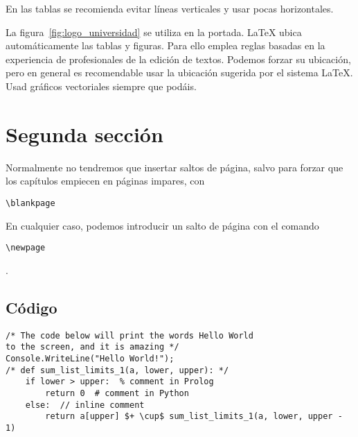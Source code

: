 \documentclass[twoside]{tfg-urjc}
\begin{document}
En las tablas se recomienda evitar líneas verticales y usar pocas horizontales. 

La figura~\ref{fig:logo_universidad} se utiliza en la portada. \LaTeX
ubica automáticamente las tablas y figuras. Para ello emplea reglas
basadas en la experiencia de profesionales de la edición de
textos. Podemos forzar su ubicación, pero en general es recomendable
usar la ubicación sugerida por el sistema \LaTeX. Usad gráficos
vectoriales siempre que podáis.




\section{Segunda sección}

Normalmente no tendremos que insertar saltos de página, salvo para forzar que los capítulos empiecen en páginas impares, con \begin{verbatim}\blankpage\end{verbatim} En cualquier caso, podemos introducir un salto de página con el comando \begin{verbatim}\newpage\end{verbatim}.

\newpage



\subsection{Código}

\begin{lstlisting}
/* The code below will print the words Hello World
to the screen, and it is amazing */
Console.WriteLine("Hello World!"); 
/* def sum_list_limits_1(a, lower, upper): */
    if lower > upper:  % comment in Prolog
        return 0  # comment in Python 
    else:  // inline comment
        return a[upper] $+ \cup$ sum_list_limits_1(a, lower, upper - 1)
\end{lstlisting}

\end{document}
